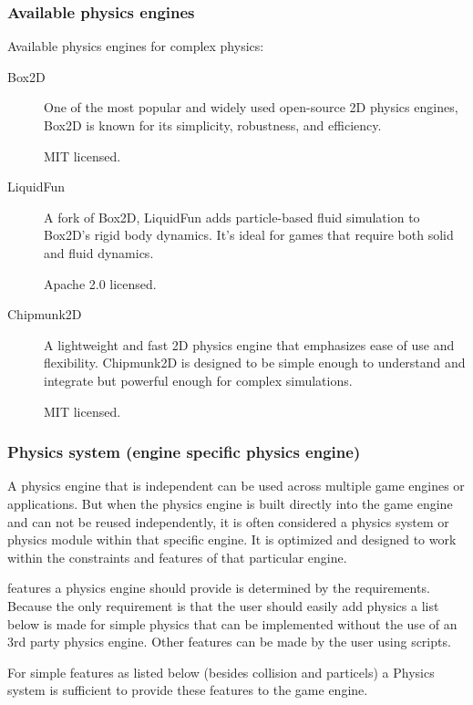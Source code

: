 \documentclass{projdoc}
\begin{document}
\subsubsection{Available physics engines}

Available physics engines for complex physics:\noparbreak
\begin{description}
	\item[Box2D] One of the most popular and widely used open-source 2D physics
		engines, Box2D is known for its simplicity, robustness, and efficiency.

		MIT licensed.
	\item[LiquidFun] A fork of Box2D, LiquidFun adds particle-based fluid simulation to
		Box2D's rigid body dynamics. It's ideal for games that require both solid and
		fluid dynamics.

		Apache 2.0 licensed.
	\item[Chipmunk2D] A lightweight and fast 2D physics engine that emphasizes ease of
		use and flexibility. Chipmunk2D is designed to be simple enough to understand and
		integrate but powerful enough for complex simulations.

		MIT licensed.
\end{description}

\subsubsection{Physics system (engine specific physics engine)}

A physics engine that is independent can be used across multiple game engines or
applications. But when the physics engine is built directly into the game engine and
can not be reused independently, it is often considered a physics system or physics
module within that specific engine. It is optimized and designed to work within the
constraints and features of that particular engine.

features a physics engine should provide is determined by the requirements. Because
the only requirement is that the user should easily add physics a list below is made
for simple physics that can be implemented without the use of an 3rd party physics
engine. Other features can be made by the user using scripts.

For simple features as listed below (besides collision and particels) a Physics
system is sufficient to provide these features to the game engine.
\end{document}
